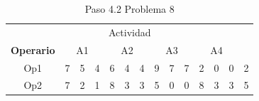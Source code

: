 \documentclass[12pt]{article}  %
\begin{document}
\begin{table}[H]
\centering
\caption{Paso 4.2 Problema 8}
\label{tab:Paso4.2Prob8}
\begin{tabular}{cccccccccccccc}
\multicolumn{14}{c}{Actividad}                                                                                                                                                                                                                                                                                                                                                                                                                                                                                                                                                                                                                                                 \\ \cline{2-13}
\multicolumn{1}{c|}{\textbf{Operario}} & \multicolumn{3}{c|}{A1}                                                                                                                          & \multicolumn{3}{c|}{A2}                                                                                                                          & \multicolumn{3}{c|}{A3}                                                                                                                          & \multicolumn{3}{c|}{A4}                                                                                                                          & \multicolumn{1}{l}{}      \\ \cline{2-13}
\multicolumn{1}{c|}{Op1}               & \multicolumn{1}{c|}{\cellcolor[HTML]{67FD9A}7} & \multicolumn{1}{c|}{\cellcolor[HTML]{FFCC67}5} & \multicolumn{1}{c|}{\cellcolor[HTML]{FCFF2F}4} & \multicolumn{1}{c|}{\cellcolor[HTML]{67FD9A}6} & \multicolumn{1}{c|}{\cellcolor[HTML]{FFCC67}4} & \multicolumn{1}{c|}{\cellcolor[HTML]{F8FF00}4} & \multicolumn{1}{c|}{\cellcolor[HTML]{67FD9A}9} & \multicolumn{1}{c|}{\cellcolor[HTML]{FFCC67}7} & \multicolumn{1}{c|}{\cellcolor[HTML]{F8FF00}7} & \multicolumn{1}{c|}{\cellcolor[HTML]{67FD9A}2} & \multicolumn{1}{c|}{\cellcolor[HTML]{FFC702}0} & \multicolumn{1}{c|}{\cellcolor[HTML]{F8FF00}0} & \cellcolor[HTML]{FFCCC9}2 \\ \cline{2-13}
\multicolumn{1}{c|}{Op2}               & \multicolumn{1}{c|}{\cellcolor[HTML]{67FD9A}7} & \multicolumn{1}{c|}{\cellcolor[HTML]{FFCC67}2} & \multicolumn{1}{c|}{\cellcolor[HTML]{FCFF2F}1} & \multicolumn{1}{c|}{\cellcolor[HTML]{67FD9A}8} & \multicolumn{1}{c|}{\cellcolor[HTML]{FFCC67}3} & \multicolumn{1}{c|}{\cellcolor[HTML]{F8FF00}3} & \multicolumn{1}{c|}{\cellcolor[HTML]{67FD9A}5} & \multicolumn{1}{c|}{\cellcolor[HTML]{FFCC67}0} & \multicolumn{1}{c|}{\cellcolor[HTML]{F8FF00}0} & \multicolumn{1}{c|}{\cellcolor[HTML]{67FD9A}8} & \multicolumn{1}{c|}{\cellcolor[HTML]{FFC702}3} & \multicolumn{1}{c|}{\cellcolor[HTML]{F8FF00}3} & \cellcolor[HTML]{FFCCC9}5 \\ \cline{2-13}

\end{tabular}
\end{table}
\end{document}
